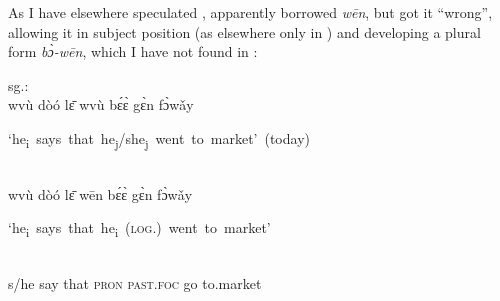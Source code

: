 \documentclass[output=paper]{langsci/langscibook}
\begin{document}
\begin{table}
 \caption{Noni personal pronouns including logophoric}
    \label{extab:grassfields:13}
\end{table}


As I have elsewhere speculated \citep[15-16]{Hyman1981},  apparently borrowed \textit{wēn}, but got it “wrong”, allowing it in subject position (as elsewhere only in ) and developing a plural form \textit{bɔ̀-wēn}, which I have not found in :

\newpage
\let\eachwordone=\itshape\small
\let\eachwordtwo=\itshape\small
\let\eachwordthree=\upshape\small
\ea%
    \label{ex:grassfields:14}
    \ea 
    sg.: \\
    \glll wvù dòó lɛ̄ wvù bɛ́ɛ̀ gɛ̀n fɔ̀wǎy \parbox{1mm}{\mbox{\hspace*{-3mm}\scriptsize ‘he\textsubscript{i} says that he\textsubscript{j}/she\textsubscript{j} went to market’ (today)}}\\
           wvù dòó lɛ̄ wēn bɛ́ɛ̀ gɛ̀n fɔ̀wǎy \parbox{1mm}{\mbox{\hspace*{-3mm}\scriptsize ‘he\textsubscript{i} says that he\textsubscript{i}~(\textsc{log}.) went to market’}}\\
           s/he say that \textsc{pron} \textsc{past.foc} go to.market\\
\end{document}
